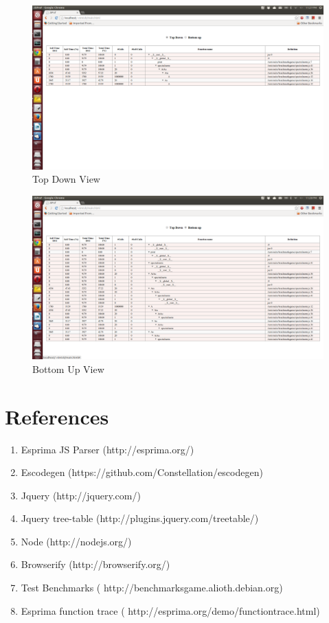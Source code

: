 \documentclass[paper=a4, fontsize=11pt]{scrartcl} %
\numberwithin{equation}{section} %
\numberwithin{figure}{section} %
\numberwithin{table}{section} %
\begin{document}
\begin{figure}[ht!]
\centering
\includegraphics[width=150mm]{1.png}
\caption{Top Down View}
\label{overflow}
\end{figure}

\begin{figure}[ht!]
\centering
\includegraphics[width=150mm]{2.png}
\caption{Bottom Up View}
\label{overflow}
\end{figure}

\section{References}

\begin{enumerate}
\item Esprima JS Parser (http://esprima.org/)
\item Escodegen (https://github.com/Constellation/escodegen) 
\item Jquery (http://jquery.com/)
\item Jquery tree-table (http://plugins.jquery.com/treetable/)
\item Node (http://nodejs.org/) 
\item Browserify (http://browserify.org/)
\item Test Benchmarks ( http://benchmarksgame.alioth.debian.org)
\item Esprima function trace ( http://esprima.org/demo/functiontrace.html)
\end{enumerate}
\end{document}
